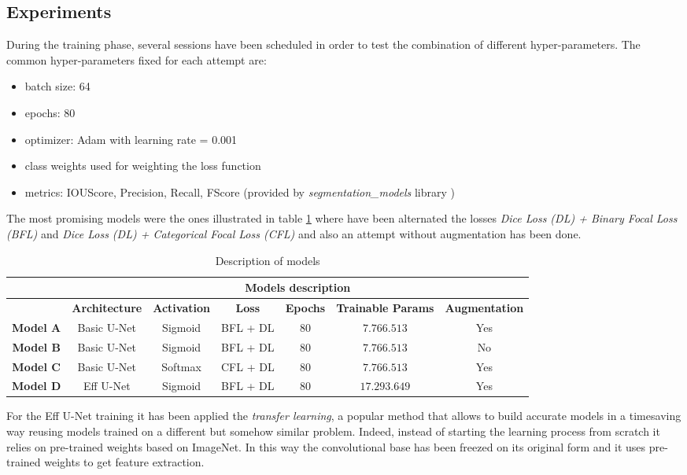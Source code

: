 \documentclass[a4paper,10pt]{report}
\begin{document}
\subsection{Experiments}\label{subsec:subsection-422}
During the training phase, several sessions have been scheduled in order to test the combination of different hyper-parameters.
The common hyper-parameters fixed for each attempt are:
\begin{itemize}
    \item batch size: 64
    \item epochs: 80
    \item optimizer: Adam with learning rate = 0.001
    \item class weights used for weighting the loss function
    \item metrics: IOUScore, Precision, Recall, FScore (provided by \emph{segmentation_models} library \cite{segmentation-models})
\end{itemize}

The most promising models were the ones illustrated in table \ref{table:models} where have been alternated the losses \textit{Dice Loss (DL) +  Binary Focal Loss (BFL)} and \textit{Dice Loss (DL) +  Categorical Focal Loss (CFL)} and also an attempt without augmentation has been done.

\begin{table}[h]
\center
  \begin{tabular}{|c|c|c|c|c|c|c|}
  \hline
    \multirow{2}{*}{} & \multicolumn{6}{c|}{\textbf{Models description}}  \\ \hline 
                        & \textbf{Architecture} & \textbf{Activation} & \textbf{Loss}& \textbf{Epochs} & \textbf{Trainable Params} & \textbf{Augmentation} \\ \hline
    \textbf{Model A}   & Basic U-Net & Sigmoid & BFL + DL & $80$ & $7.766.513$ & Yes \\ \hline
    \textbf{Model B}      & Basic U-Net & Sigmoid & BFL + DL & $80$ & $7.766.513$ & No \\ \hline
    \textbf{Model C}       & Basic U-Net & Softmax & CFL + DL & $80$ & $7.766.513$ & Yes  \\ \hline
    \textbf{Model D} & Eff U-Net & Sigmoid & BFL + DL & $80$ & $17.293.649$ & Yes \\ \hline
  \end{tabular}
  \caption{Description of models}
  \label{table:models}
\end{table}


For the Eff U-Net training it has been applied the \textit{transfer learning}, a popular method that allows to build accurate models in a timesaving way reusing models trained on a different but somehow similar problem.
Indeed, instead of starting the learning process from scratch it relies on pre-trained weights based on ImageNet. In this way the convolutional base has been freezed on its original form and it uses pre-trained weights to get feature extraction.
\end{document}
